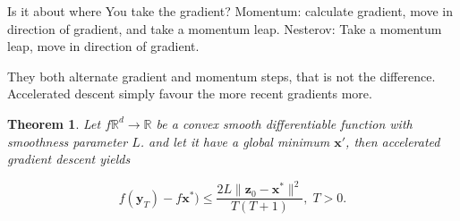 \documentclass{article}
\newtheorem{theorem}{Theorem}[section]
\begin{document}
		Is it about where You take the gradient? Momentum: calculate gradient, move in direction of gradient, and take a momentum leap. Nesterov: Take a momentum leap, move in direction of gradient.
		
		They both alternate gradient and momentum steps, that is not the difference. Accelerated descent simply favour the more recent gradients more.
		
		\begin{theorem}
			Let $f\mathbb{R}^d\to\mathbb{R}$ be a convex smooth differentiable function with smoothness parameter $L$. and let it have a global minimum $\mathbf{x'}$, then accelerated gradient descent yields
			
			\[ f(\mathbf{y}_T) - f\mathbf{x^*}) \le  \frac{ 2L \| \mathbf{z}_0 - \mathbf{x}^* \|^2}{T(T+1)},\; T>0.  \]
		\end{theorem}
\end{document}
